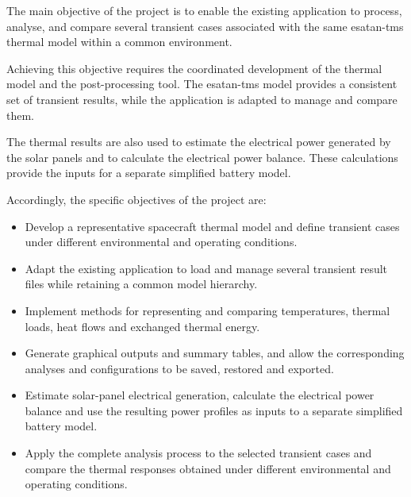 The main objective of the project is to enable the existing application to
process, analyse, and compare several transient cases associated with the same
\acrshort{esatan-tms} thermal model within a common environment.

Achieving this objective requires the coordinated development of the thermal
model and the post-processing tool. The \acrshort{esatan-tms} model provides
a consistent set of transient results, while the application is adapted to
manage and compare them. 

The thermal results are also used to estimate the electrical power generated
by the solar panels and to calculate the electrical power balance. These
calculations provide the inputs for a separate simplified battery model. 

Accordingly, the specific objectives of the project are:

\begin{itemize}
    \item Develop a representative spacecraft thermal model and define
    transient cases under different environmental and operating conditions.

    \item Adapt the existing application to load and manage several transient
    result files while retaining a common model hierarchy.

    \item Implement methods for representing and comparing temperatures,
    thermal loads, heat flows and exchanged thermal energy.

    \item Generate graphical outputs and summary tables, and allow the
    corresponding analyses and configurations to be saved, restored and
    exported.

    \item Estimate solar-panel electrical generation, calculate the electrical
    power balance and use the resulting power profiles as inputs to a separate
    simplified battery model.

    \item Apply the complete analysis process to the selected transient cases and compare
    the thermal responses obtained under different environmental and operating
    conditions.
\end{itemize}